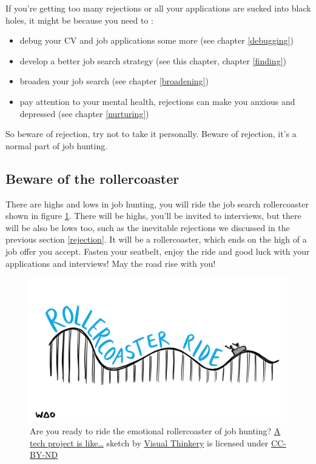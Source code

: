 \documentclass[
]{book}
\providecommand{\tightlist}{%
  \setlength{\itemsep}{0pt}\setlength{\parskip}{0pt}}
\begin{document}
If you're getting too many rejections or all your applications are sucked into black holes, it might be because you need to :

\begin{itemize}
\tightlist
\item
  debug your CV and job applications some more (see chapter \ref{debugging})
\item
  develop a better job search strategy (see this chapter, chapter \ref{finding})
\item
  broaden your job search (see chapter \ref{broadening})
\item
  pay attention to your mental health, rejections can make you anxious and depressed (see chapter \ref{nurturing})
\end{itemize}

So beware of rejection, try not to take it personally. Beware of rejection, it's a normal part of job hunting. 🤮

\hypertarget{rollercoaster}{%
\subsection{Beware of the rollercoaster}\label{rollercoaster}}

There are highs and lows in job hunting, you will ride the job search rollercoaster shown in figure \ref{fig:rollercoaster-fig}. There will be highs, you'll be invited to interviews, but there will be also be lows too, such as the inevitable rejections we discussed in the previous section \ref{rejection}. It will be a rollercoaster, which ends on the high of a job offer you accept. Fasten your seatbelt, enjoy the ride and good luck with your applications and interviews! May the road rise with you! \citep{rise}

\begin{figure}

{\centering \includegraphics[width=0.98\linewidth]{images/Rollercoaster-ride} 

}

\caption{Are you ready to ride the emotional rollercoaster of job hunting? \href{https://bryanmmathers.com/rollercoaster-ride}{A tech project is like\ldots{}} sketch by \href{https://visualthinkery.com/}{Visual Thinkery} is licensed under \href{https://creativecommons.org/licenses/by-nd/4.0/}{CC-BY-ND}}\label{fig:rollercoaster-fig}
\end{figure}
\end{document}
